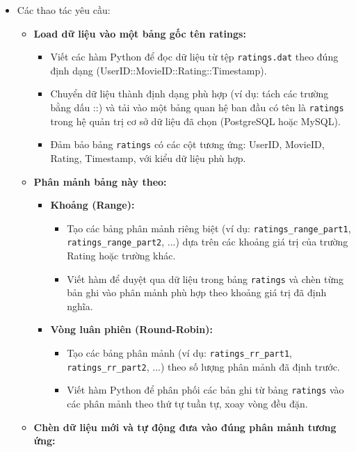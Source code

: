 \documentclass[14pt]{extarticle}
\begin{document}
\begin{itemize}
    \item Các thao tác yêu cầu:
    \begin{itemize}
        \item \textbf{Load dữ liệu vào một bảng gốc tên ratings:}
        \begin{itemize}
            \item Viết các hàm Python để đọc dữ liệu từ tệp \texttt{ratings.dat} theo đúng định dạng (UserID::MovieID::Rating::Timestamp).
            \item Chuyển dữ liệu thành định dạng phù hợp (ví dụ: tách các trường bằng dấu ::) và tải vào một bảng quan hệ ban đầu có tên là \texttt{ratings} trong hệ quản trị cơ sở dữ liệu đã chọn (PostgreSQL hoặc MySQL).
            \item Đảm bảo bảng \texttt{ratings} có các cột tương ứng: UserID, MovieID, Rating, Timestamp, với kiểu dữ liệu phù hợp.
        \end{itemize}
        \item \textbf{Phân mảnh bảng này theo:}
        \begin{itemize}
            \item \textbf{Khoảng (Range):}
            \begin{itemize}
                \item Tạo các bảng phân mảnh riêng biệt (ví dụ: \texttt{ratings\_range\_part1}, \texttt{ratings\_range\_part2}, ...) dựa trên các khoảng giá trị của trường Rating hoặc trường khác.
                \item Viết hàm để duyệt qua dữ liệu trong bảng \texttt{ratings} và chèn từng bản ghi vào phân mảnh phù hợp theo khoảng giá trị đã định nghĩa.
            \end{itemize}
            \item \textbf{Vòng luân phiên (Round-Robin):}
            \begin{itemize}
                \item Tạo các bảng phân mảnh (ví dụ: \texttt{ratings\_rr\_part1}, \texttt{ratings\_rr\_part2}, ...) theo số lượng phân mảnh đã định trước.
                \item Viết hàm Python để phân phối các bản ghi từ bảng \texttt{ratings} vào các phân mảnh theo thứ tự tuần tự, xoay vòng đều đặn.
            \end{itemize}
        \end{itemize}
        \item \textbf{Chèn dữ liệu mới và tự động đưa vào đúng phân mảnh tương ứng:}
        \begin{itemize}

\end{itemize}
\end{itemize}
\end{itemize}
\end{document}
